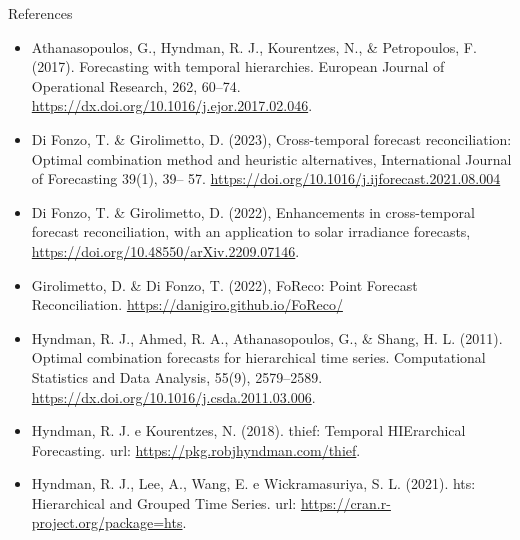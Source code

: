 \documentclass[aspectratio=169, table,colorlinks]{beamer}
\begin{document}
\begin{frame}{References}
\footnotesize
	\begin{itemize}[label = {}, itemindent=-10pt, leftmargin=*]
		\item Athanasopoulos, G., Hyndman, R. J., Kourentzes, N., \& Petropoulos, F. (2017). Forecasting with temporal hierarchies. European Journal of Operational Research, 262, 60–74. \url{https://dx.doi.org/10.1016/j.ejor.2017.02.046}.
		\item Di Fonzo, T. \& Girolimetto, D. (2023), Cross-temporal forecast reconciliation: Optimal combination method and heuristic alternatives, International Journal of Forecasting 39(1), 39– 57. \url{https://doi.org/10.1016/j.ijforecast.2021.08.004}
		\item Di Fonzo, T. \& Girolimetto, D. (2022), Enhancements in cross-temporal forecast reconciliation, with an application to solar irradiance forecasts, \url{https://doi.org/10.48550/arXiv.2209.07146}.
		\item Girolimetto, D. \& Di Fonzo, T. (2022), FoReco: Point Forecast Reconciliation. \url{https://danigiro.github.io/FoReco/}
		\item Hyndman, R. J., Ahmed, R. A., Athanasopoulos, G., \& Shang, H. L. (2011). Optimal combination forecasts for hierarchical time series. Computational Statistics and Data Analysis, 55(9), 2579–2589. \url{https://dx.doi.org/10.1016/j.csda.2011.03.006}.
		\item Hyndman, R. J. e Kourentzes, N. (2018). thief: Temporal HIErarchical Forecasting. url: \url{https://pkg.robjhyndman.com/thief}.
		\item Hyndman, R. J., Lee, A., Wang, E. e Wickramasuriya, S. L. (2021). hts: Hierarchical and Grouped Time Series. url: \url{https://cran.r-project.org/package=hts}.
	\end{itemize}
\end{frame}
\end{document}
